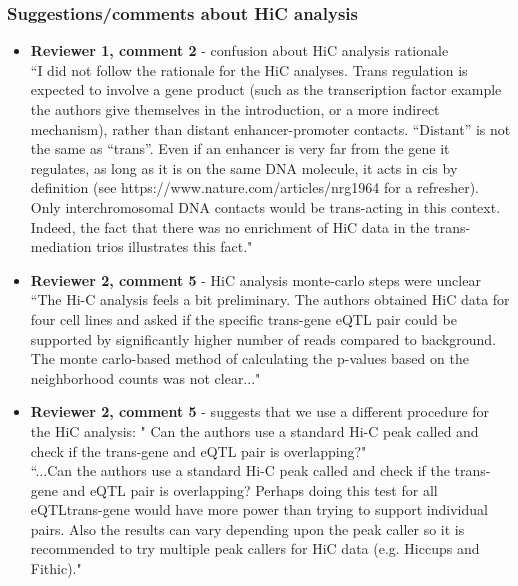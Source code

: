 \documentclass[a4paper,12pt]{article}
\begin{document}
	\subsubsection*{Suggestions/comments about HiC analysis}
	\begin{itemize}
		\item \textbf{Reviewer 1, comment 2} - confusion about HiC analysis rationale\\
		
		``I did not follow the rationale for the HiC analyses. Trans regulation is expected to involve a gene product (such as the transcription factor example the authors give themselves in the introduction, or a more indirect mechanism), rather than distant enhancer-promoter contacts. “Distant” is not the same as “trans”. Even if an enhancer is very far from the gene it regulates, as long as it is on the same DNA molecule, it acts in cis by definition (see https://www.nature.com/articles/nrg1964 for a refresher). Only interchromosomal DNA contacts would be trans-acting in this context. Indeed, the fact that there was no enrichment of HiC data in the trans-mediation trios illustrates this fact."
		
		\item \textbf{Reviewer 2, comment 5} - HiC analysis monte-carlo steps were unclear\\
		
		``The Hi-C analysis feels a bit preliminary. The authors obtained HiC data for four cell lines and asked if the specific trans-gene eQTL pair could be supported by significantly higher number of reads compared to background. The monte carlo-based method of calculating the p-values based on the neighborhood counts was not clear..."
		
		\item \textbf{Reviewer 2, comment 5} - suggests that we use a different procedure for the HiC analysis: " Can the authors use a standard Hi-C peak called and check if the trans-gene and eQTL pair is overlapping?"\\
		
		``...Can the authors use a
		standard Hi-C peak called and check if the trans-gene and eQTL pair is overlapping? Perhaps doing this test for all eQTLtrans-gene would have more power than trying to support individual pairs. Also the results can vary depending upon the peak caller so it is recommended to try multiple peak callers for HiC data (e.g. Hiccups and Fithic)."
		
	\end{itemize}
	
\end{document}
